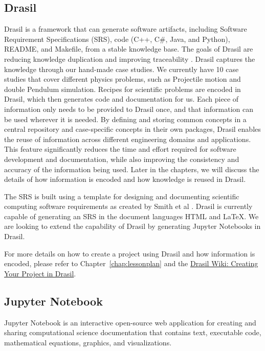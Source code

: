\subsection{Drasil} \label{chap:intro_drasil}
Drasil is a framework that can generate software artifacts, including Software 
Requirement Specifications (SRS), code (C++, C\#, Java, and Python), README, 
and Makefile, from a stable knowledge base. The goals of Drasil are reducing 
knowledge duplication and improving traceability \cite{drasil}. Drasil captures 
the knowledge through our hand-made case studies. We currently have 10 case 
studies that cover different physics problems, such as Projectile motion and 
double Pendulum simulation. Recipes for scientific problems are encoded in 
Drasil, which then generates code and documentation for us. Each piece of 
information only needs to be provided to Drasil once, and that information can 
be used wherever it is needed. By defining and storing common concepts in a 
central repository and case-specific concepts in their own packages, Drasil 
enables the reuse of information across different engineering domains and 
applications. This feature significantly reduces the time and effort required 
for software development and documentation, while also improving the 
consistency and accuracy of the information being used. Later in the chapters, 
we will discuss the details of how information is encoded and how knowledge is 
reused in Drasil.

The SRS is built using a template for designing and documenting scientific 
computing software requirements as created by Smith et al \cite{smith2005new}. 
Drasil is currently capable of generating an SRS in the document languages HTML 
and LaTeX. We are looking to extend the capability of Drasil by generating 
Jupyter Notebooks in Drasil.

For more details on how to create a project using Drasil and how information is 
encoded, please refer to Chapter~\ref{chap:lessonplan} and the 
\href{https://github.com/JacquesCarette/Drasil/wiki/Creating-Your-Project-in-Drasil}{Drasil
	Wiki: Creating Your Project in Drasil}. 

\subsection{Jupyter Notebook} \label{chap:intro_notebook}
Jupyter Notebook is an interactive open-source web application for creating and 
sharing computational science documentation that contains text, executable 
code, mathematical equations, graphics, and visualizations.

